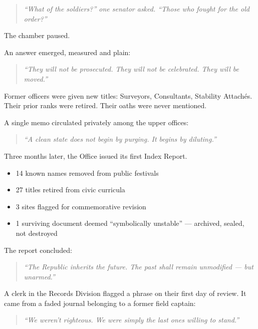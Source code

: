 \documentclass[12pt]{article}
\begin{document}
\begin{quote}
\textit{“What of the soldiers?” one senator asked. “Those who fought for the old order?”}
\end{quote}

The chamber paused.

An answer emerged, measured and plain:

\begin{quote}
\textit{“They will not be prosecuted. They will not be celebrated. They will be moved.”}
\end{quote}

Former officers were given new titles: Surveyors, Consultants, Stability Attachés. Their prior ranks were retired. Their oaths were never mentioned.

A single memo circulated privately among the upper offices:

\begin{quote}
\textit{“A clean state does not begin by purging. It begins by diluting.”}
\end{quote}

\vspace{1em}

Three months later, the Office issued its first Index Report.

\begin{itemize}
    \item 14 known names removed from public festivals
    \item 27 titles retired from civic curricula
    \item 3 sites flagged for commemorative revision
    \item 1 surviving document deemed ``symbolically unstable'' --- archived, sealed, not destroyed
\end{itemize}

The report concluded:

\begin{quote}
\textit{“The Republic inherits the future. The past shall remain unmodified --- but unarmed.”}
\end{quote}

\vspace{1em}

A clerk in the Records Division flagged a phrase on their first day of review. It came from a faded journal belonging to a former field captain:

\begin{quote}
\textit{“We weren’t righteous. We were simply the last ones willing to stand.”}
\end{quote}
\end{document}
